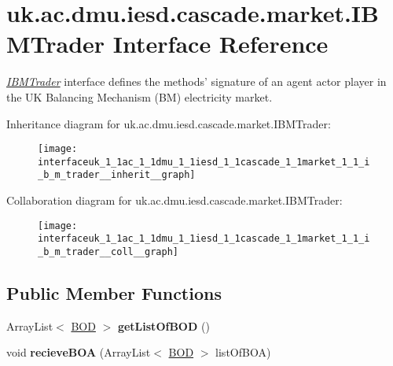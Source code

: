 \hypertarget{interfaceuk_1_1ac_1_1dmu_1_1iesd_1_1cascade_1_1market_1_1_i_b_m_trader}{\section{uk.\-ac.\-dmu.\-iesd.\-cascade.\-market.\-I\-B\-M\-Trader Interface Reference}
\label{interfaceuk_1_1ac_1_1dmu_1_1iesd_1_1cascade_1_1market_1_1_i_b_m_trader}
}


{\itshape \hyperlink{interfaceuk_1_1ac_1_1dmu_1_1iesd_1_1cascade_1_1market_1_1_i_b_m_trader}{I\-B\-M\-Trader}} interface defines the methods' signature of an agent actor player in the U\-K Balancing Mechanism (B\-M) electricity market.  




Inheritance diagram for uk.\-ac.\-dmu.\-iesd.\-cascade.\-market.\-I\-B\-M\-Trader\-:\nopagebreak
\begin{figure}[H]
\begin{center}
\leavevmode
\texttt{[image: interfaceuk\_1\_1ac\_1\_1dmu\_1\_1iesd\_1\_1cascade\_1\_1market\_1\_1\_i\_b\_m\_trader\_\_inherit\_\_graph]}
\end{center}
\end{figure}


Collaboration diagram for uk.\-ac.\-dmu.\-iesd.\-cascade.\-market.\-I\-B\-M\-Trader\-:\nopagebreak
\begin{figure}[H]
\begin{center}
\leavevmode
\texttt{[image: interfaceuk\_1\_1ac\_1\_1dmu\_1\_1iesd\_1\_1cascade\_1\_1market\_1\_1\_i\_b\_m\_trader\_\_coll\_\_graph]}
\end{center}
\end{figure}
\subsection*{Public Member Functions}
\begin{DoxyCompactItemize}
\item 
\hypertarget{interfaceuk_1_1ac_1_1dmu_1_1iesd_1_1cascade_1_1market_1_1_i_b_m_trader_abc81affcba0a918802ab84714fea7408}{Array\-List$<$ \hyperlink{classuk_1_1ac_1_1dmu_1_1iesd_1_1cascade_1_1agents_1_1aggregators_1_1_b_o_d}{B\-O\-D} $>$ {\bfseries get\-List\-Of\-B\-O\-D} ()}\label{interfaceuk_1_1ac_1_1dmu_1_1iesd_1_1cascade_1_1market_1_1_i_b_m_trader_abc81affcba0a918802ab84714fea7408}

\item 
\hypertarget{interfaceuk_1_1ac_1_1dmu_1_1iesd_1_1cascade_1_1market_1_1_i_b_m_trader_ad95522704796a72e0c750a990fb79c54}{void {\bfseries recieve\-B\-O\-A} (Array\-List$<$ \hyperlink{classuk_1_1ac_1_1dmu_1_1iesd_1_1cascade_1_1agents_1_1aggregators_1_1_b_o_d}{B\-O\-D} $>$ list\-Of\-B\-O\-A)}\label{interfaceuk_1_1ac_1_1dmu_1_1iesd_1_1cascade_1_1market_1_1_i_b_m_trader_ad95522704796a72e0c750a990fb79c54}

\end{DoxyCompactItemize}


